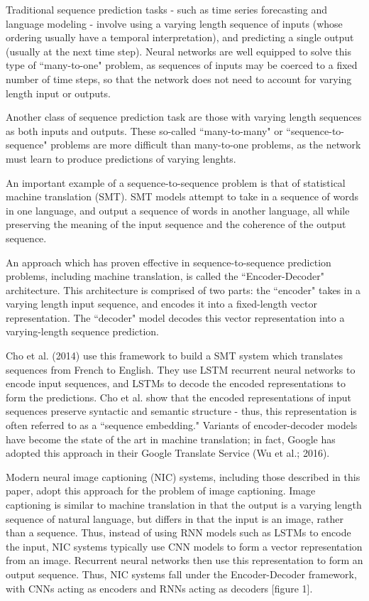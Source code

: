 \documentclass[letterpaper, 10 pt, conference]{ieeeconf}
\begin{document}
Traditional sequence prediction tasks - such as time series forecasting and language modeling - involve using a varying length sequence of inputs (whose ordering usually have a temporal interpretation), and predicting a single output (usually at the next time step). Neural networks are well equipped to solve this type of ``many-to-one" problem, as sequences of inputs may be coerced to a fixed number of time steps, so that the network does not need to account for varying length input or outputs.

Another class of sequence prediction task are those with varying length sequences as both inputs and outputs. These so-called ``many-to-many" or ``sequence-to-sequence" problems are more difficult than many-to-one problems, as the network must learn to produce predictions of varying lenghts.

An important example of a sequence-to-sequence problem is that of statistical machine translation (SMT). SMT models attempt to take in a sequence of words in one language, and output a sequence of words in another language, all while preserving the meaning of the input sequence and the coherence of the output sequence.


An approach which has proven effective in sequence-to-sequence prediction problems, including machine translation, is called the ``Encoder-Decoder" architecture. This architecture is comprised of two parts: the ``encoder" takes in a varying length input sequence, and encodes it into a fixed-length vector representation. The ``decoder" model decodes this vector representation into a varying-length sequence prediction. 

Cho et al. (2014) use this framework to build a SMT system which translates sequences from French to English. They use LSTM recurrent neural networks to encode input sequences, and LSTMs to decode the encoded representations to form the predictions. Cho et al. show that the encoded representations of input sequences preserve syntactic and semantic structure - thus, this representation is often referred to as a ``sequence embedding." Variants of encoder-decoder models have become the state of the art in machine translation; in fact, Google has adopted this approach in their Google Translate Service (Wu et al.; 2016).

Modern neural image captioning (NIC) systems, including those described in this paper, adopt this approach for the problem of image captioning. Image captioning is similar to machine translation in that the output is a varying length sequence of natural language, but differs in that the input is an image, rather than a sequence. Thus, instead of using RNN models such as LSTMs to encode the input, NIC systems typically use CNN models to form a vector representation from an image. Recurrent neural networks then use this representation to form an output sequence. Thus, NIC systems fall under the Encoder-Decoder framework, with CNNs acting as encoders and RNNs acting as decoders [figure 1]. 
\end{document}

